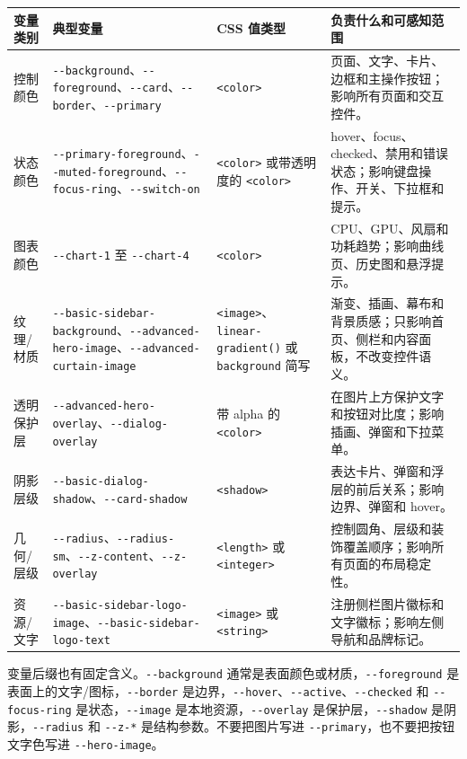 \documentclass[UTF8,11pt,a4paper]{ctexart}
\begin{document}
\begin{longtable}[]{@{}L{0.15\textwidth}L{0.34\textwidth}L{0.22\textwidth}L{0.22\textwidth}@{}}
\toprule\noalign{}
变量类别 & 典型变量 & CSS 值类型 & 负责什么和可感知范围 \\
\midrule\noalign{}
\endhead
\bottomrule\noalign{}
\endlastfoot
控制颜色 & \texttt{-\/-background}、\texttt{-\/-foreground}、\texttt{-\/-card}、\texttt{-\/-border}、\texttt{-\/-primary} & \texttt{<color>} & 页面、文字、卡片、边框和主操作按钮；影响所有页面和交互控件。 \\
状态颜色 & \texttt{-\/-primary-foreground}、\texttt{-\/-muted-foreground}、\texttt{-\/-focus-ring}、\texttt{-\/-switch-on} & \texttt{<color>} 或带透明度的 \texttt{<color>} & hover、focus、checked、禁用和错误状态；影响键盘操作、开关、下拉框和提示。 \\
图表颜色 & \texttt{-\/-chart-1} 至 \texttt{-\/-chart-4} & \texttt{<color>} & CPU、GPU、风扇和功耗趋势；影响曲线页、历史图和悬浮提示。 \\
纹理/材质 & \texttt{-\/-basic-sidebar-background}、\texttt{-\/-advanced-hero-image}、\texttt{-\/-advanced-curtain-image} & \texttt{<image>}、\texttt{linear-gradient()} 或 \texttt{background} 简写 & 渐变、插画、幕布和背景质感；只影响首页、侧栏和内容面板，不改变控件语义。 \\
透明保护层 & \texttt{-\/-advanced-hero-overlay}、\texttt{-\/-dialog-overlay} & 带 alpha 的 \texttt{<color>} & 在图片上方保护文字和按钮对比度；影响插画、弹窗和下拉菜单。 \\
阴影层级 & \texttt{-\/-basic-dialog-shadow}、\texttt{-\/-card-shadow} & \texttt{<shadow>} & 表达卡片、弹窗和浮层的前后关系；影响边界、弹窗和 hover。 \\
几何/层级 & \texttt{-\/-radius}、\texttt{-\/-radius-sm}、\texttt{-\/-z-content}、\texttt{-\/-z-overlay} & \texttt{<length>} 或 \texttt{<integer>} & 控制圆角、层级和装饰覆盖顺序；影响所有页面的布局稳定性。 \\
资源/文字 & \texttt{-\/-basic-sidebar-logo-image}、\texttt{-\/-basic-sidebar-logo-text} & \texttt{<image>} 或 \texttt{<string>} & 注册侧栏图片徽标和文字徽标；影响左侧导航和品牌标记。 \\
\end{longtable}

变量后缀也有固定含义。\texttt{-\/-background} 通常是表面颜色或材质，\texttt{-\/-foreground} 是表面上的文字/图标，\texttt{-\/-border} 是边界，\texttt{-\/-hover}、\texttt{-\/-active}、\texttt{-\/-checked} 和 \texttt{-\/-focus-ring} 是状态，\texttt{-\/-image} 是本地资源，\texttt{-\/-overlay} 是保护层，\texttt{-\/-shadow} 是阴影，\texttt{-\/-radius} 和 \texttt{-\/-z-*} 是结构参数。不要把图片写进 \texttt{-\/-primary}，也不要把按钮文字色写进 \texttt{-\/-hero-image}。
\end{document}
